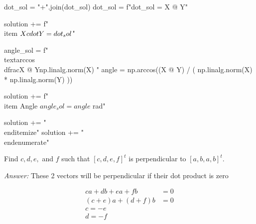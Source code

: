 \documentclass[letterpaper]{article}
\newcommand{\ans}{\textit{Answer: }}
\newenvironment{question}[2][Question]{\begin{trivlist}
\item[\hskip \labelsep {\bfseries #1}\hskip \labelsep {\bfseries #2.}]}{\end{trivlist}}
\begin{document}
\begin{question}{6.1}
\begin{pycode}
  dot_sol = "+".join(dot_sol)
  dot_sol = f"{dot_sol} = {X @ Y}"

  solution += f"\\item $X \\cdot Y = {dot_sol}$\n"

  angle_sol = f"\\text{{arccos}}\\dfrac{{{X @ Y}}}{{{np.linalg.norm(X)} }}"
  angle = np.arccos((X @ Y) / (
    np.linalg.norm(X)
    * np.linalg.norm(Y)
  ))

  solution += f"\\item Angle ${angle_sol} = {angle}$ rad\n"


  solution += "\\end{itemize}\n"
solution += "\\end{enumerate}\n"
  \end{pycode}


\end{question}

\begin{question}{6.3}
  Find $c, d, e,$ and $f$ such that $[c, d, e, f]^{t}$ is perpendicular to $[a, b, a, b]^{t}$.

  \ans These 2 vectors will be perpendicular if their dot product is zero

  \begin{align*}
    ca + db + ea + fb &= 0 \\
    (c + e)a + (d + f)b &= 0 \\
    c = -e \\
    d = -f
  \end{align*}
\end{question}
\end{document}
